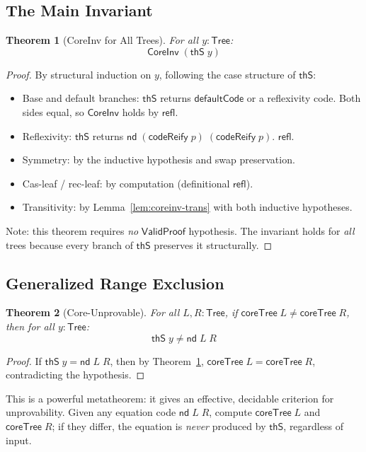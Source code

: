\documentclass[11pt]{article}
\newtheorem{theorem}{Theorem}
\newcommand{\nd}{\mathsf{nd}}
\newcommand{\codeReify}{\mathsf{codeReify}}
\newcommand{\thS}{\mathsf{thS}}
\newcommand{\Tree}{\mathsf{Tree}}
\newcommand{\ValidProof}{\mathsf{ValidProof}}
\newcommand{\coreTree}{\mathsf{coreTree}}
\newcommand{\CoreInv}{\mathsf{CoreInv}}
\begin{document}
\subsection{The Main Invariant}

\begin{theorem}[CoreInv for All Trees]\label{thm:coreinv-all}
For all $y : \Tree$:
\[
  \CoreInv\;(\thS\;y)
\]
\end{theorem}
\begin{proof}
By structural induction on $y$, following the case structure of $\thS$:
\begin{itemize}
  \item Base and default branches: $\thS$ returns $\mathsf{defaultCode}$ or a
    reflexivity code. Both sides equal, so $\CoreInv$ holds by $\mathsf{refl}$.
  \item Reflexivity: $\thS$ returns $\nd\;(\codeReify\;p)\;(\codeReify\;p)$.
    $\mathsf{refl}$.
  \item Symmetry: by the inductive hypothesis and swap preservation.
  \item Cas-leaf / rec-leaf: by computation (definitional $\mathsf{refl}$).
  \item Transitivity: by Lemma~\ref{lem:coreinv-trans} with both inductive hypotheses.
\end{itemize}
Note: this theorem requires \emph{no} $\ValidProof$ hypothesis. The invariant
holds for \emph{all} trees because every branch of $\thS$ preserves it structurally.
\end{proof}

\subsection{Generalized Range Exclusion}

\begin{theorem}[Core-Unprovable]\label{thm:core-unprov}
For all $L, R : \Tree$, if $\coreTree\;L \neq \coreTree\;R$, then for all $y : \Tree$:
\[
  \thS\;y \neq \nd\;L\;R
\]
\end{theorem}
\begin{proof}
If $\thS\;y = \nd\;L\;R$, then by Theorem~\ref{thm:coreinv-all},
$\coreTree\;L = \coreTree\;R$, contradicting the hypothesis.
\end{proof}

\noindent This is a powerful metatheorem: it gives an effective, decidable
criterion for unprovability. Given any equation code $\nd\;L\;R$, compute
$\coreTree\;L$ and $\coreTree\;R$; if they differ, the equation is
\emph{never} produced by $\thS$, regardless of input.
\end{document}
